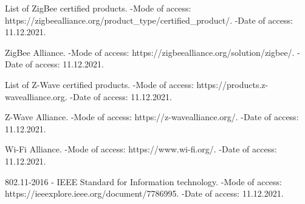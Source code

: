 \newpage
 	
	 \begin{thebibliography}{1}
	 	
	 	 List of ZigBee certified products. -Mode of access: 
	 	\newline https://zigbeealliance.org/product\_type/certified\_product/. -Date of access: 11.12.2021.
	 	
	 	 ZigBee Alliance. -Mode of access: 
	 	\newline https://zigbeealliance.org/solution/zigbee/. -Date of access: 11.12.2021.
	 	
	 	 List of Z-Wave certified products. -Mode of access: 
	 	\newline https://products.z-wavealliance.org. -Date of access: 11.12.2021.
	 	
	 	 Z-Wave Alliance. -Mode of access: 
	 	\newline https://z-wavealliance.org/. -Date of access: 11.12.2021.
	 	
	 	 Wi-Fi Alliance. -Mode of access: 
	 	\newline https://www.wi-fi.org/. -Date of access: 11.12.2021.
	 	
	 	 802.11-2016 - IEEE Standard for Information technology. -Mode of access: 
	 	\newline https://ieeexplore.ieee.org/document/7786995. -Date of access: 11.12.2021.
	 	
	 \end{thebibliography}